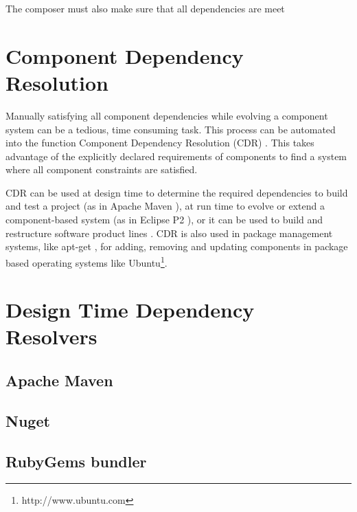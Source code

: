 The composer must also make sure that all dependencies are meet

\section{Component Dependency Resolution}
Manually satisfying all component dependencies while evolving a component system can be a tedious, time consuming task.
This process can be automated into the function Component Dependency Resolution (CDR) \cite{Jenson2010}.
This takes advantage of the explicitly declared requirements of components to find a system where all component constraints are satisfied.

CDR can be used at design time to determine the required dependencies to build and test a project (as in Apache Maven \cite{casey_better_2008}),
at run time to evolve or extend a component-based system (as in Eclipse P2 \cite{leBerre2010}),
or it can be used to build and restructure software product lines \cite{savolainen_analyzing_2007}.
CDR is also used in package management systems, like apt-get \cite{Barth2005},
for adding, removing and updating components in package based operating systems like Ubuntu\footnote{http://www.ubuntu.com}. 


\section{Design Time Dependency Resolvers}

\subsection{Apache Maven}

\subsection{Nuget} 

\subsection{RubyGems bundler}

